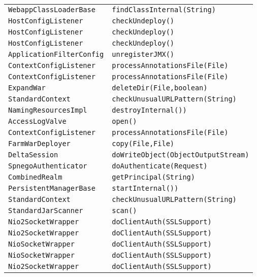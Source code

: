 \begin{center}
\begin{longtable}{ll}
\lstinline/WebappClassLoaderBase/&{\lstinline/findClassInternal(String)/}\\
\lstinline/HostConfigListener/&{\lstinline/checkUndeploy()/}\\
\lstinline/HostConfigListener/&{\lstinline/checkUndeploy()/}\\
\lstinline/HostConfigListener/&{\lstinline/checkUndeploy()/}\\
\lstinline/ApplicationFilterConfig/&{\lstinline/unregisterJMX()/}\\
\lstinline/ContextConfigListener/&{\lstinline/processAnnotationsFile(File)/}\\
\lstinline/ContextConfigListener/&{\lstinline/processAnnotationsFile(File)/}\\
\lstinline/ExpandWar/&{\lstinline/deleteDir(File,boolean)/}\\
\lstinline/StandardContext/&{\lstinline/checkUnusualURLPattern(String)/}\\
\lstinline/NamingResourcesImpl/&{\lstinline/destroyInternal())/}\\
\lstinline/AccessLogValve/&{\lstinline/open()/}\\
\lstinline/ContextConfigListener/&{\lstinline/processAnnotationsFile(File)/}\\
\lstinline/FarmWarDeployer/&{\lstinline/copy(File,File)/}\\
\lstinline/DeltaSession/&{\lstinline/doWriteObject(ObjectOutputStream)/}\\
\lstinline/SpnegoAuthenticator/&{\lstinline/doAuthenticate(Request)/}\\
\lstinline/CombinedRealm/&{\lstinline/getPrincipal(String)/}\\
\lstinline/PersistentManagerBase/&{\lstinline/startInternal())/}\\
\lstinline/StandardContext/&{\lstinline/checkUnusualURLPattern(String)/}\\
\lstinline/StandardJarScanner/&{\lstinline/scan()/}\\
\lstinline/Nio2SocketWrapper/&{\lstinline/doClientAuth(SSLSupport)/}\\
\lstinline/Nio2SocketWrapper/&{\lstinline/doClientAuth(SSLSupport)/}\\
\lstinline/NioSocketWrapper/&{\lstinline/doClientAuth(SSLSupport)/}\\
\lstinline/NioSocketWrapper/&{\lstinline/doClientAuth(SSLSupport)/}\\
\lstinline/Nio2SocketWrapper/&{\lstinline/doClientAuth(SSLSupport)/}\\

\end{longtable}
\end{center}
